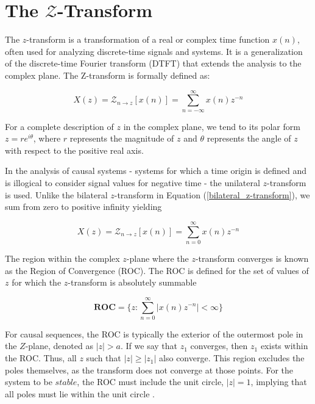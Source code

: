 \documentclass[a4paper]{report}
\begin{document}
\section{The \texorpdfstring{$\mathcal{Z}$}{Lg}-Transform}

The $z$-transform is a transformation of a real or complex time function $x(n)$, often used for analyzing discrete-time signals and systems. It is a generalization of the discrete-time Fourier transform (DTFT) that extends the analysis to the complex plane. The Z-transform is formally defined as:

\begin{equation}\label{bilateral_z-transform}
X(z) = \mathcal{Z}_{n \rightarrow z}[x(n)] = \sum^{\infty}_{n = -\infty} x(n)z^{-n}
\end{equation}

\noindent For a complete description of $z$ in the complex plane, we tend to its polar form $z = re^{i\theta}$, where $r$ represents the magnitude of $z$ and $\theta$ represents the angle of $z$ with respect to the positive real axis.

In the analysis of causal systems - systems for which a time origin is defined and is illogical to consider signal values for negative time - the unilateral $z$-transform is used. Unlike the bilateral $z$-transform in Equation (\ref{bilateral_z-transform}), we sum from zero to positive infinity yielding

\begin{equation}\label{unilateral_z-transform}
X(z) = \mathcal{Z}_{n \rightarrow z}[x(n)] = \sum^{\infty}_{n = 0} x(n)z^{-n}
\end{equation}

The region within the complex $z$-plane where the $z$-transform converges is known as the Region of Convergence (ROC). The ROC is defined for the set of values of $z$ for which the $z$-transform is absolutely summable

\begin{equation}\label{roc}
\textbf{ROC} = \Biggl\{ z : \sum^{\infty}_{n = 0} |x(n)z^{-n}| < \infty \Biggr\}
\end{equation}

For causal sequences, the ROC is typically the exterior of the outermost pole in the $Z$-plane, denoted as $|z| > a$. If we say that $z_1$ converges, then $z_1$ exists within the ROC. Thus, all $z$ such that $|z| \geq |z_1|$ also converge. This region excludes the poles themselves, as the transform does not converge at those points. For the system to be $stable$, the ROC must include the unit circle, $|z| = 1$, implying that all poles must lie within the unit circle \citep{LovelessGuido2021}.
\end{document}
